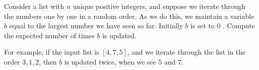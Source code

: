 \problem{}

Consider a list with $n$ unique positive integers, and suppose we iterate through the numbers one by one in a random order. As we do this, we maintain a variable $b$ equal to the largest number we have seen so far. Initially $b$ is set to 0 . Compute the expected number of times $b$ is updated.

For example, if the input list is $[4,7,5]$, and we iterate through the list in the order $3,1,2$, then $b$ is updated twice, when we see $5$ and $7$.

\solution{}







